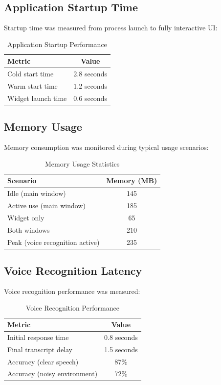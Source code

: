 \subsection{Application Startup Time}

Startup time was measured from process launch to fully interactive UI:

\begin{table}[htbp]
\centering
\caption{Application Startup Performance}
\label{tab:startup-performance}
\begin{tabular}{@{}lc@{}}
\toprule
\textbf{Metric} & \textbf{Value} \\
\midrule
Cold start time & 2.8 seconds \\
Warm start time & 1.2 seconds \\
Widget launch time & 0.6 seconds \\
\bottomrule
\end{tabular}
\end{table}

\subsection{Memory Usage}

Memory consumption was monitored during typical usage scenarios:

\begin{table}[htbp]
\centering
\caption{Memory Usage Statistics}
\label{tab:memory-usage}
\begin{tabular}{@{}lc@{}}
\toprule
\textbf{Scenario} & \textbf{Memory (MB)} \\
\midrule
Idle (main window) & 145 \\
Active use (main window) & 185 \\
Widget only & 65 \\
Both windows & 210 \\
Peak (voice recognition active) & 235 \\
\bottomrule
\end{tabular}
\end{table}

\subsection{Voice Recognition Latency}

Voice recognition performance was measured:

\begin{table}[htbp]
\centering
\caption{Voice Recognition Performance}
\label{tab:voice-performance}
\begin{tabular}{@{}lc@{}}
\toprule
\textbf{Metric} & \textbf{Value} \\
\midrule
Initial response time & 0.8 seconds \\
Final transcript delay & 1.5 seconds \\
Accuracy (clear speech) & 87\% \\
Accuracy (noisy environment) & 72\% \\
\bottomrule
\end{tabular}
\end{table}

